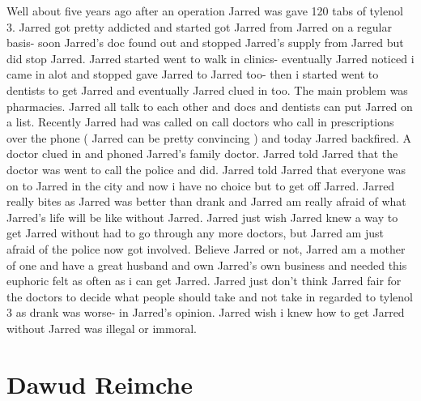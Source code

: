 \documentclass[12pt]{book}
\begin{document}
Well about five years ago after an operation Jarred was gave 120 tabs of tylenol 3. Jarred got pretty addicted and started got Jarred from Jarred on a regular basis- soon Jarred's doc found out and stopped Jarred's supply from Jarred but did stop Jarred. Jarred started went to walk in clinics- eventually Jarred noticed i came in alot and stopped gave Jarred to Jarred too- then i started went to dentists to get Jarred and eventually Jarred clued in too. The main problem was pharmacies. Jarred all talk to each other and docs and dentists can put Jarred on a list. Recently Jarred had was called on call doctors who call in prescriptions over the phone (  Jarred can be pretty convincing  ) and today Jarred backfired. A doctor clued in and phoned Jarred's family doctor. Jarred told Jarred that the doctor was went to call the police and did. Jarred told Jarred that everyone was on to Jarred in the city and now i have no choice but to get off Jarred. Jarred really bites as Jarred was better than drank and Jarred am really afraid of what Jarred's life will be like without Jarred. Jarred just wish Jarred knew a way to get Jarred without had to go through any more doctors, but Jarred am just afraid of the police now got involved. Believe Jarred or not, Jarred am a mother of one and have a great husband and own Jarred's own business and needed this euphoric felt as often as i can get Jarred. Jarred just don't think Jarred fair for the doctors to decide what people should take and not take in regarded to tylenol 3 as drank was worse- in Jarred's opinion. Jarred wish i knew how to get Jarred without Jarred was illegal or immoral.



\chapter{Dawud Reimche}
\end{document}
